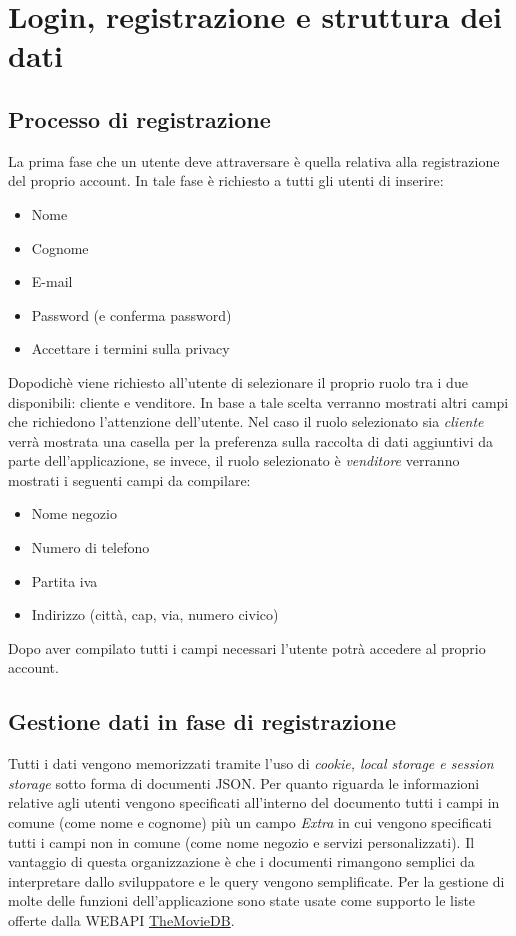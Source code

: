 \documentclass{article}
\begin{document}
\section{Login, registrazione e struttura dei dati}
    \subsection{Processo di registrazione}
    La prima fase che un utente deve attraversare è quella relativa alla registrazione del proprio account.
    In tale fase è richiesto a tutti gli utenti di inserire:
        \begin{itemize}
            \item Nome
            \item Cognome
            \item E-mail
            \item Password (e conferma password)
            \item Accettare i termini sulla privacy
        \end{itemize}
    Dopodichè viene richiesto all'utente di selezionare il proprio ruolo tra i due disponibili: cliente e venditore. In base a tale scelta verranno mostrati altri campi che
    richiedono l'attenzione dell'utente.
    Nel caso il ruolo selezionato sia \emph{cliente} verrà mostrata una casella per la preferenza sulla raccolta di dati aggiuntivi da parte dell'applicazione,
    se invece, il ruolo selezionato è \emph{venditore} verranno mostrati i seguenti campi da compilare:
        \begin{itemize}
            \item Nome negozio
            \item Numero di telefono
            \item Partita iva
            \item Indirizzo (città, cap, via, numero civico)
        \end{itemize}
    Dopo aver compilato tutti i campi necessari l'utente potrà accedere al proprio account.


    \subsection{Gestione dati in fase di registrazione}
    Tutti i dati vengono memorizzati tramite l'uso di \emph{cookie, local storage e session storage} sotto forma di documenti JSON.
    Per quanto riguarda le informazioni relative agli utenti vengono specificati all'interno del documento tutti i campi in comune (come nome e cognome) più un campo \emph{Extra} in cui vengono specificati tutti i campi non in comune (come nome negozio e servizi personalizzati).
    Il vantaggio di questa organizzazione è che i documenti rimangono semplici da interpretare dallo sviluppatore e le query vengono semplificate.
    Per la gestione di molte delle funzioni dell'applicazione sono state usate come supporto le liste offerte dalla WEBAPI \href{https://developers.themoviedb.org/3/getting-started/introduction}{TheMovieDB}.
\end{document}
